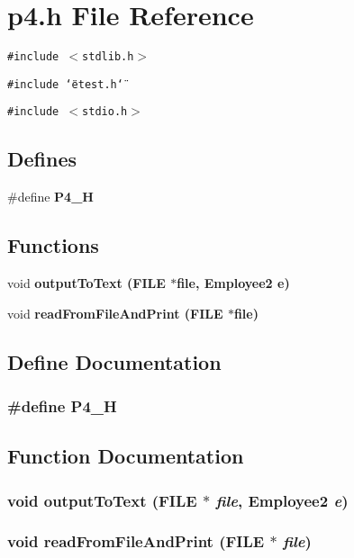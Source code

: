 \section{p4.h File Reference}
\label{p4_8h}
{\tt \#include $<$stdlib.h$>$}\par
{\tt \#include \char`\"{}etest.h\char`\"{}}\par
{\tt \#include $<$stdio.h$>$}\par
\subsection*{Defines}
\begin{CompactItemize}
\item 
\#define \bf{P4\_\-H}
\end{CompactItemize}
\subsection*{Functions}
\begin{CompactItemize}
\item 
void \bf{output\-To\-Text} (FILE $\ast$file, \bf{Employee2} e)
\item 
void \bf{read\-From\-File\-And\-Print} (FILE $\ast$file)
\end{CompactItemize}


\subsection{Define Documentation}
\subsubsection{\setlength{\rightskip}{0pt plus 5cm}\#define P4\_\-H}\label{p4_8h_a4cad9ff127646faa4fa62b1a3ee70e1}




\subsection{Function Documentation}
\subsubsection{\setlength{\rightskip}{0pt plus 5cm}void output\-To\-Text (FILE $\ast$ {\em file}, \bf{Employee2} {\em e})}\label{p4_8h_b687547d29f0c5aede02dea2f5cc08f3}


\subsubsection{\setlength{\rightskip}{0pt plus 5cm}void read\-From\-File\-And\-Print (FILE $\ast$ {\em file})}\label{p4_8h_0ca2d781d6deb7f3675ac356ab172eb8}


